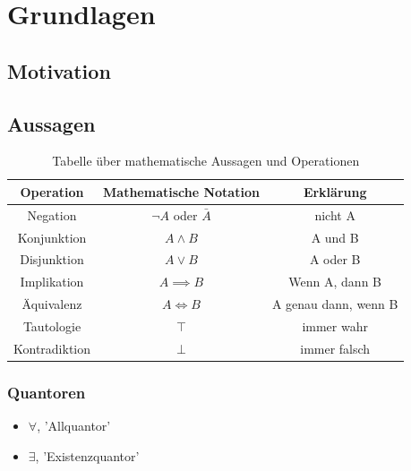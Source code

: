 \chapter{Grundlagen}

\section{Motivation}


\section{Aussagen}





\begin{table}[h!]
    \centering
    \renewcommand{\arraystretch}{1.5} %
    \begin{tabular}{|c|c|c|}
        \hline
        \textbf{Operation} & \textbf{Mathematische Notation} & \textbf{Erklärung} \\
        \hline
        Negation & $\neg A$ oder $\bar A$  & nicht A \\
        \hline
        Konjunktion & $A \land B$ & A und B \\
        \hline
        Disjunktion & $A \lor B$ & A oder B \\
        \hline
        Implikation & $A \implies B$ & Wenn A, dann B \\
        \hline
        Äquivalenz & $A \iff B$ & A genau dann, wenn B \\
        \hline
        Tautologie & $\top$ & immer wahr \\
        \hline
        Kontradiktion & $\bot$ & immer falsch \\
        \hline
    \end{tabular}
    \caption{Tabelle über mathematische Aussagen und Operationen}
\end{table}


\subsection{Quantoren}
\begin{itemize}
    \item $\forall$, 'Allquantor'
    \item $\exists$, 'Existenzquantor'
\end{itemize}

